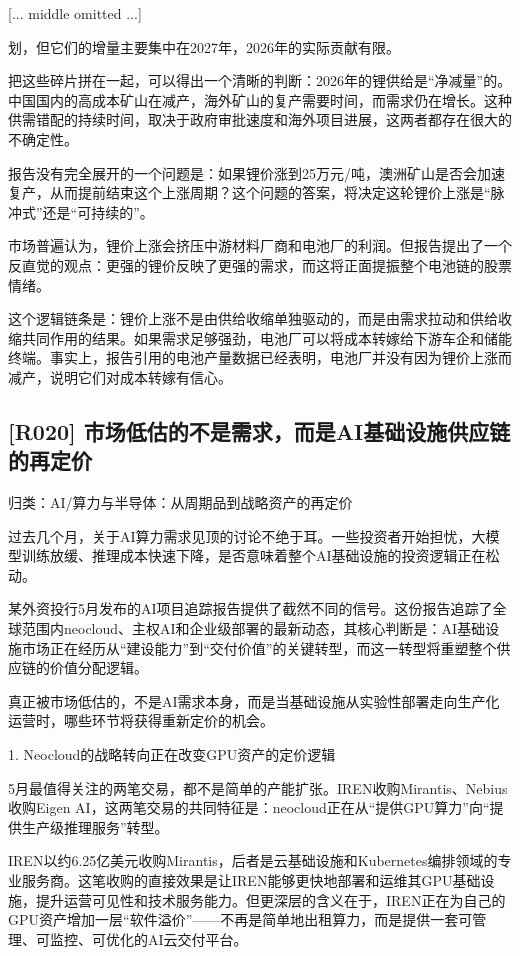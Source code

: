 \documentclass[11pt]{ctexart}
\begin{document}
[... middle omitted ...]

划，但它们的增量主要集中在2027年，2026年的实际贡献有限。

把这些碎片拼在一起，可以得出一个清晰的判断：2026年的锂供给是“净减量”的。中国国内的高成本矿山在减产，海外矿山的复产需要时间，而需求仍在增长。这种供需错配的持续时间，取决于政府审批速度和海外项目进展，这两者都存在很大的不确定性。

报告没有完全展开的一个问题是：如果锂价涨到25万元/吨，澳洲矿山是否会加速复产，从而提前结束这个上涨周期？这个问题的答案，将决定这轮锂价上涨是“脉冲式”还是“可持续的”。

市场普遍认为，锂价上涨会挤压中游材料厂商和电池厂的利润。但报告提出了一个反直觉的观点：更强的锂价反映了更强的需求，而这将正面提振整个电池链的股票情绪。

这个逻辑链条是：锂价上涨不是由供给收缩单独驱动的，而是由需求拉动和供给收缩共同作用的结果。如果需求足够强劲，电池厂可以将成本转嫁给下游车企和储能终端。事实上，报告引用的电池产量数据已经表明，电池厂并没有因为锂价上涨而减产，说明它们对成本转嫁有信心。

\subsection{[R020] 市场低估的不是需求，而是AI基础设施供应链的再定价}
{\small\color{refgray}归类：AI/算力与半导体：从周期品到战略资产的再定价}

过去几个月，关于AI算力需求见顶的讨论不绝于耳。一些投资者开始担忧，大模型训练放缓、推理成本快速下降，是否意味着整个AI基础设施的投资逻辑正在松动。

某外资投行5月发布的AI项目追踪报告提供了截然不同的信号。这份报告追踪了全球范围内neocloud、主权AI和企业级部署的最新动态，其核心判断是：AI基础设施市场正在经历从“建设能力”到“交付价值”的关键转型，而这一转型将重塑整个供应链的价值分配逻辑。

真正被市场低估的，不是AI需求本身，而是当基础设施从实验性部署走向生产化运营时，哪些环节将获得重新定价的机会。

1. Neocloud的战略转向正在改变GPU资产的定价逻辑

5月最值得关注的两笔交易，都不是简单的产能扩张。IREN收购Mirantis、Nebius收购Eigen AI，这两笔交易的共同特征是：neocloud正在从“提供GPU算力”向“提供生产级推理服务”转型。

IREN以约6.25亿美元收购Mirantis，后者是云基础设施和Kubernetes编排领域的专业服务商。这笔收购的直接效果是让IREN能够更快地部署和运维其GPU基础设施，提升运营可见性和技术服务能力。但更深层的含义在于，IREN正在为自己的GPU资产增加一层“软件溢价”——不再是简单地出租算力，而是提供一套可管理、可监控、可优化的AI云交付平台。
\end{document}
